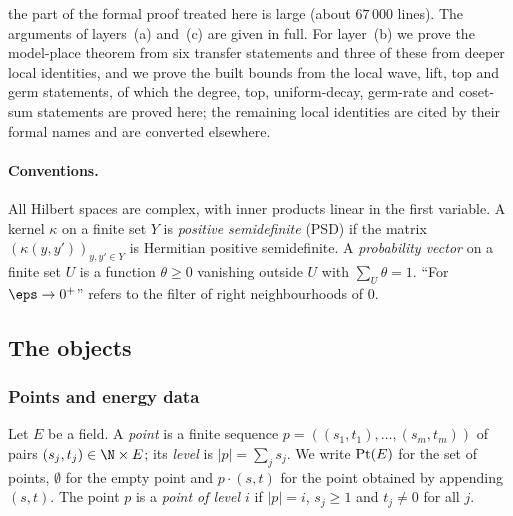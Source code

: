 the part of the formal proof treated here is large (about $67\,000$ lines). The arguments of layers~(a) and~(c) are given
in full. For layer~(b) we prove the model-place theorem from six transfer statements and three of these from deeper local
identities, and we prove the built bounds from the local wave, lift, top and germ statements, of which the degree, top,
uniform-decay, germ-rate and coset-sum statements are proved here; the remaining local identities are cited by their formal
names and are converted elsewhere.

\paragraph{Conventions.}
All Hilbert spaces are complex, with inner products linear in the first variable. A kernel $\kappa$ on a finite set $Y$
is \emph{positive semidefinite} (PSD) if the matrix $(\kappa(y,y'))_{y,y'\in Y}$ is Hermitian positive semidefinite. A
\emph{probability vector} on a finite set $U$ is a function $\theta\ge0$ vanishing outside $U$ with $\sum_U\theta=1$.
``For $\eps\to0^+$'' refers to the filter of right neighbourhoods of $0$.

\subsection{The objects}\label{sec:pf:thmS-carrier:objects}

\subsubsection{Points and energy data}
Let $E$ be a field. A \emph{point} is a finite sequence $p=((s_1,t_1),\dots,(s_m,t_m))$ of pairs $(s_j,t_j)\in\N\times
E$; its \emph{level} is $|p|=\sum_js_j$. We write $\mathrm{Pt}(E)$ for the set of points, $\emptyset$ for the empty
point and $p\cdot(s,t)$ for the point obtained by appending $(s,t)$. The point $p$ is a \emph{point of level $i$} if
$|p|=i$, $s_j\ge1$ and $t_j\ne0$ for all $j$.

